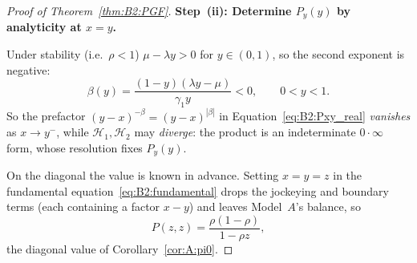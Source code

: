 \begin{proof}[Proof of Theorem~\ref{thm:B2:PGF}]
\medskip\noindent\textbf{Step~(ii): Determine $P_y(y)$ by analyticity at $x=y$.}
\medskip

Under stability (i.e.\ $\rho<1$) $\mu-\lambda y>0$ for $y\in(0,1)$, so the second exponent is negative:
\begin{equation}
    \beta(y) = \frac{(1-y)(\lambda y-\mu)}{\gamma_1 y} < 0,
    \qquad 0<y<1.
    \label{eq:B2:beta_negative}
\end{equation}
So the prefactor $(y-x)^{-\beta}=(y-x)^{|\beta|}$ in Equation~\eqref{eq:B2:Pxy_real} \emph{vanishes} as $x\to y^{-}$, while $\mathcal{H}_1,\mathcal{H}_2$ may \emph{diverge}: the product is an indeterminate $0\cdot\infty$ form, whose resolution fixes $P_y(y)$.

On the diagonal the value is known in advance. Setting $x=y=z$ in the fundamental equation~\eqref{eq:B2:fundamental} drops the jockeying and boundary terms (each containing a factor $x-y$) and leaves Model~$A$'s balance, so
\begin{equation}
    P(z,z) = \frac{\rho(1-\rho)}{1-\rho z},
    \label{eq:B2:regular_value}
\end{equation}
the diagonal value of Corollary~\ref{cor:A:pi0}.


\end{proof}
